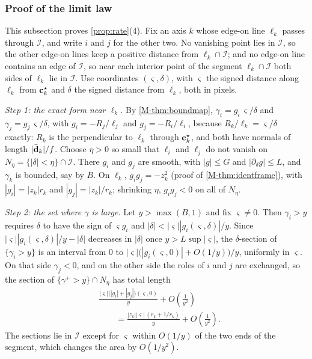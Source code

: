 \subsubsection{Proof of the limit law}\label{app:limit}

This subsection proves \cref{prop:rate}(4). Fix an axis $k$ whose edge-on line $\ell_k$ passes through $\mathcal I$, and write $i$ and $j$ for the other two. No vanishing point lies in $\mathcal I$, so the other edge-on lines keep a positive distance from $\ell_k\cap \mathcal I$; and no edge-on line contains an edge of $\mathcal I$, so near each interior point of the segment $\ell_k\cap \mathcal I$ both sides of $\ell_k$ lie in $\mathcal I$. Use coordinates $(\varsigma,\delta)$, with $\varsigma$ the signed distance along $\ell_k$ from $\mathbf{c}^{\star}_k$ and $\delta$ the signed distance from $\ell_k$, both in pixels.

\emph{Step 1: the exact form near $\ell_k$.} By \cref{M-thm:boundmap}, $\gamma_i=g_i\,\varsigma/\delta$ and $\gamma_j=g_j\,\varsigma/\delta$, with $g_i=-R_j/\ell_j$ and $g_j=-R_i/\ell_i$, because $R_k/\ell_k=\varsigma/\delta$ exactly: $R_k$ is the perpendicular to $\ell_k$ through $\mathbf{c}^{\star}_k$, and both have normals of length $|\bar{\mathbf{d}}_k|/f$. Choose $\eta>0$ so small that $\ell_i$ and $\ell_j$ do not vanish on $N_\eta=\{|\delta|<\eta\}\cap \mathcal I$. There $g_i$ and $g_j$ are smooth, with $|g|\le G$ and $|\partial_\delta g|\le L$, and $\gamma_k$ is bounded, say by $B$. On $\ell_k$, $g_ig_j=-z_k^2$ (proof of \cref{M-thm:identframe}), with $|g_i|=|z_k|r_k$ and $|g_j|=|z_k|/r_k$; shrinking $\eta$, $g_ig_j<0$ on all of $N_\eta$.

\emph{Step 2: the set where $\gamma$ is large.} Let $y>\max(B,1)$ and fix $\varsigma\neq0$. Then $\gamma_i>y$ requires $\delta$ to have the sign of $\varsigma g_i$ and $|\delta|<|\varsigma||g_i(\varsigma,\delta)|/y$. Since $|\varsigma||g_i(\varsigma,\delta)|/y-|\delta|$ decreases in $|\delta|$ once $y>L\sup|\varsigma|$, the $\delta$-section of $\{\gamma_i>y\}$ is an interval from $0$ to $|\varsigma|\bigl(|g_i(\varsigma,0)|+O(1/y)\bigr)/y$, uniformly in $\varsigma$. On that side $\gamma_j<0$, and on the other side the roles of $i$ and $j$ are exchanged, so the section of $\{\gamma^+>y\}\cap N_\eta$ has total length
\[
\begin{aligned}
&\frac{|\varsigma|\bigl(|g_i|+|g_j|\bigr)(\varsigma,0)}{y}+O\!\left(\frac1{y^2}\right)\\
&\qquad=\frac{|z_k||\varsigma|\,(r_k+1/r_k)}{y}+O\!\left(\frac1{y^2}\right).
\end{aligned}
\]
The sections lie in $\mathcal I$ except for $\varsigma$ within $O(1/y)$ of the two ends of the segment, which changes the area by $O(1/y^2)$.

